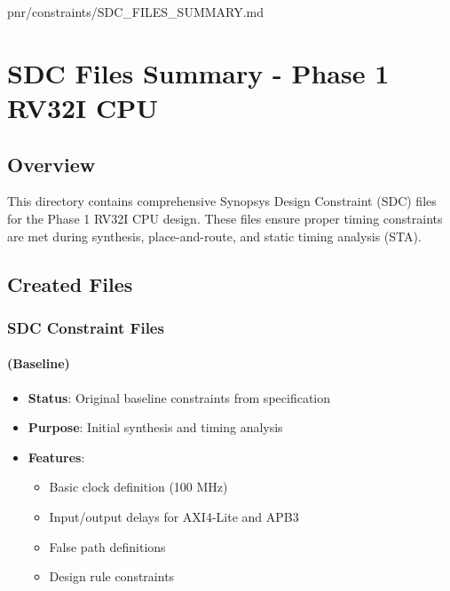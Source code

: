 \begin{relocated}{pnr/constraints/SDC_FILES_SUMMARY.md}
\section{SDC Files Summary - Phase 1 RV32I CPU}\label{tm:pd:constraints-sdc-files-summary}

\subsection{Overview}\label{tm:pd:constraints-sdc-files-summary:overview}

This directory contains comprehensive Synopsys Design Constraint (SDC)
files for the Phase 1 RV32I CPU design. These files ensure proper timing
constraints are met during synthesis, place-and-route, and static timing
analysis (STA).

\subsection{Created Files}\label{tm:pd:constraints-sdc-files-summary:created-files}

\subsubsection{SDC Constraint Files}\label{tm:pd:constraints-sdc-files-summary:1-sdc-constraint-files}

\paragraph{\texorpdfstring{
(Baseline)}{ (Baseline)}}\label{tm:pd:constraints-sdc-files-summary:phase1-cpusdc-baseline}

\begin{itemize}
\tightlist
\item
  \textbf{Status}: Original baseline constraints from specification
\item
  \textbf{Purpose}: Initial synthesis and timing analysis
\item
  \textbf{Features}:

  \begin{itemize}
  \tightlist
  \item
    Basic clock definition (100 MHz)
  \item
    Input/\allowbreak{}output delays for AXI4-Lite and APB3
  \item
    False path definitions
  \item
    Design rule constraints
  \end{itemize}
\end{itemize}


\end{relocated}
